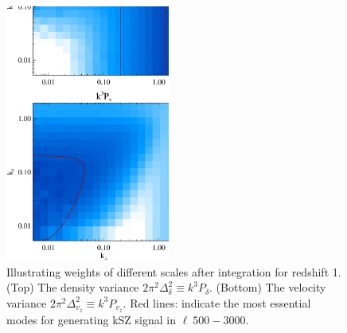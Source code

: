 \begin{figure}[tbp]
\begin{center}
\includegraphics[width=0.48\textwidth]{figure/k3pd_k3pv_z1.eps}
\end{center}
\vspace{-0.7cm}
\caption{
    Illustrating weights of different scales after integration for redshift 1.
    (Top) The density variance $2\pi^2\Delta_\delta^2\equiv k^3P_\delta$. 
    (Bottom) The velocity variance $2\pi^2\Delta_{v_z}^2\equiv k^3P_{v_z}$. 
    Red lines: indicate the most essential modes for generating kSZ signal in 
    $\ell~500-3000$.
}
\label{fig:k3v}
\end{figure}

